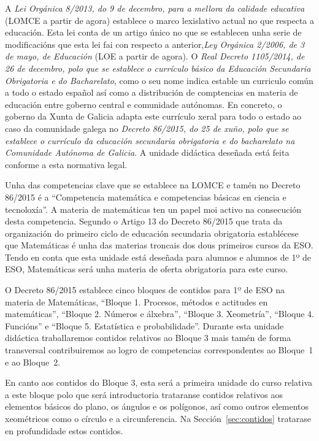 A \emph{Lei Orgánica 8/2013, do 9 de decembro, para a mellora da calidade educativa} (LOMCE a partir de agora) establece o marco lexislativo actual no que respecta a educación. Esta lei conta de un artigo único no que se establecen unha serie de modificacións que esta lei fai con respecto a anterior,\emph{Ley Orgánica 2/2006, de 3 de mayo, de Educación} (LOE a partir de agora). O \emph{Real Decreto 1105/2014, de 26 de decembro, polo que se establece o currículo básico da Educación Secundaria Obrigatoria e do Bacharelato}, como o seu nome indica estable un curriculo común a todo o estado español así como a distribución de comptencias en materia de educación entre goberno central e comunidade autónomas. En concreto, o goberno da Xunta de Galicia adapta este currículo xeral para todo o estado ao caso da comunidade galega no \emph{Decreto 86/2015, do 25 de xuño, polo que se establece o currículo da educación secundaria obrigatoria e do bacharelato na Comunidade Autónoma de Galicia}. A unidade didáctica deseñada está feita conforme a esta normativa legal.

Unha das competencias clave que se establece na LOMCE e tamén no Decreto 86/2015 é a ``Competencia matemática e competencias básicas en ciencia e tecnoloxía''. A materia de matemáticas ten un papel moi activo na consecución desta competencia. Segundo o Artigo 13 do Decreto 86/2015 que trata da organización do primeiro ciclo de educación secundaria obrigatoria establécese que Matemáticas é unha das materias troncais dos dous primeiros cursos da ESO. Tendo en conta que esta unidade está deseñada para alumnos e alumnos de 1º de ESO, Matemáticas será unha materia de oferta obrigatoria para este curso.

O Decreto 86/2015 establece cinco bloques de contidos para 1º de ESO na materia de Matemáticas, ``Bloque 1. Procesos, métodos e actitudes en matemáticas'', ``Bloque 2. Números e álxebra'', ``Bloque 3. Xeometría'', ``Bloque 4. Funcións'' e ``Bloque 5. Estatística e probabilidade''. Durante esta unidade didáctica traballaremos contidos relativos ao Bloque 3 mais tamén de forma transversal contribuiremos ao logro de competencias correspondentes ao Bloque~1 e ao Bloque~2.

En canto aos contidos do Bloque 3, esta será a primeira unidade do curso relativa a este bloque polo que será introductoria trataranse contidos relativos aos elementos básicos do plano, os ángulos e os polígonos, así como outros elementos xeométricos como o círculo e a circunferencia. Na Sección~\ref{sec:contidos} tratarase en profundidade estos contidos.

